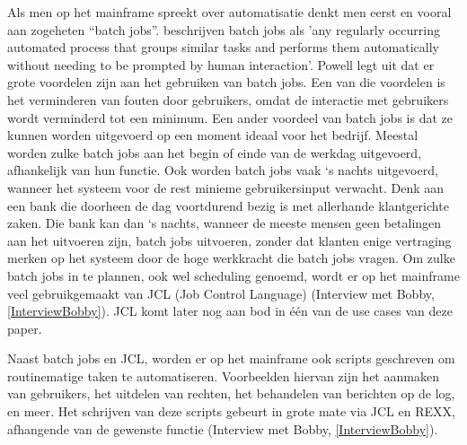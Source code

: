 Als men op het mainframe spreekt over automatisatie denkt men eerst en vooral aan zogeheten “batch jobs”. \textcites{Powell2024} beschrijven batch jobs als 'any regularly occurring automated process that groups similar tasks and performs them automatically without needing to be prompted by human interaction'. Powell legt uit dat er grote voordelen zijn aan het gebruiken van batch jobs. Een van die voordelen is het verminderen van fouten door gebruikers, omdat de interactie met gebruikers wordt verminderd tot een minimum. Een ander voordeel van batch jobs is dat ze kunnen worden uitgevoerd op een moment ideaal voor het bedrijf. Meestal worden zulke batch jobs aan het begin of einde van de werkdag uitgevoerd, afhankelijk van hun functie. Ook worden batch jobs vaak ‘s nachts uitgevoerd, wanneer het systeem voor de rest minieme gebruikersinput verwacht. Denk aan een bank die doorheen de dag voortdurend bezig is met allerhande klantgerichte zaken. Die bank kan dan ‘s nachts, wanneer de meeste mensen geen betalingen aan het uitvoeren zijn, batch jobs uitvoeren, zonder dat klanten enige vertraging merken op het systeem door de hoge werkkracht die batch jobs vragen. Om zulke batch jobs in te plannen, ook wel scheduling genoemd, wordt er op het mainframe veel gebruikgemaakt van JCL (Job Control Language) (Interview met Bobby, \ref{InterviewBobby}).
JCL komt later nog aan bod in één van de use cases van deze paper.

Naast batch jobs en JCL, worden er op het mainframe ook scripts geschreven om routinematige taken te automatiseren. Voorbeelden hiervan zijn het aanmaken van gebruikers, het uitdelen van rechten, het behandelen van berichten op de log, en meer. Het schrijven van deze scripts gebeurt in grote mate via JCL en REXX, afhangende van de gewenste functie (Interview met Bobby, \ref{InterviewBobby}).

